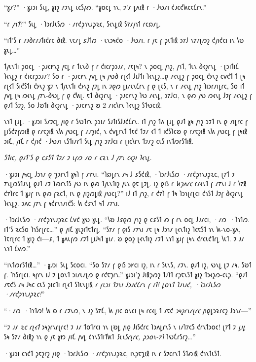 “𐑣𐑥?” ·𐑣𐑨𐑮𐑦 𐑕𐑧𐑛, 𐑣𐑦𐑟 𐑥𐑲𐑯𐑛 𐑧𐑤𐑕𐑢𐑺. “𐑣𐑴𐑤𐑛 𐑪𐑯, 𐑲'𐑥 𐑛𐑵𐑦𐑙 𐑩 ·𐑓𐑻𐑥𐑦 𐑒𐑨𐑤𐑒𐑿𐑤𐑱𐑖𐑩𐑯.”

“𐑩 \emph{𐑢𐑪𐑑}?” 𐑕𐑧𐑛 ·𐑐𐑮𐑩𐑓𐑧𐑕𐑼 ·𐑥𐑩𐑒𐑜𐑪𐑯𐑨𐑜𐑷𐑤, 𐑕𐑬𐑯𐑛𐑦𐑙 𐑕𐑳𐑥𐑢𐑪𐑑 𐑩𐑤𐑸𐑥𐑛.

“𐑦𐑑'𐑕 𐑩 𐑥𐑨𐑔𐑩𐑥𐑨𐑑𐑦𐑒𐑩𐑤 𐑔𐑦𐑙. 𐑯𐑱𐑥𐑛 𐑭𐑓𐑑𐑼 ·𐑧𐑯𐑮𐑰𐑒𐑴 ·𐑓𐑻𐑥𐑦. 𐑩 𐑢𐑱 𐑝 𐑜𐑧𐑑𐑦𐑙 𐑮𐑳𐑓 𐑯𐑳𐑥𐑚𐑼𐑟 𐑒𐑢𐑦𐑒𐑤𐑦 𐑦𐑯 𐑘𐑹 𐑣𐑧𐑛…”

𐑑𐑢𐑧𐑯𐑑𐑦 𐑜𐑴𐑤𐑛 ·𐑜𐑨𐑤𐑾𐑯𐑟 𐑢𐑱𐑛 𐑩 𐑑𐑧𐑯𐑔 𐑝 𐑩 𐑒𐑦𐑤𐑩𐑜𐑮𐑨𐑥, 𐑥𐑱𐑚𐑰? 𐑯 𐑜𐑴𐑤𐑛 𐑢𐑪𐑟, 𐑢𐑪𐑑, 𐑑𐑧𐑯 𐑔𐑬𐑟𐑩𐑯𐑛 ·𐑚𐑮𐑦𐑑𐑦𐑖 𐑐𐑬𐑯𐑛𐑟 𐑩 𐑒𐑦𐑤𐑩𐑜𐑮𐑨𐑥? 𐑕𐑴 𐑩 ·𐑜𐑨𐑤𐑾𐑯 𐑢𐑫𐑛 𐑚𐑰 𐑢𐑻𐑔 𐑩𐑚𐑬𐑑 𐑓𐑦𐑓𐑑𐑦 𐑐𐑬𐑯𐑛𐑟…𐑞 𐑥𐑬𐑯𐑛𐑟 𐑝 𐑜𐑴𐑤𐑛 𐑒𐑶𐑯𐑟 𐑤𐑫𐑒𐑑 𐑑 𐑚𐑰 𐑩𐑚𐑬𐑑 𐑕𐑦𐑒𐑕𐑑𐑦 𐑒𐑶𐑯𐑟 𐑣𐑲 𐑯 𐑑𐑢𐑧𐑯𐑑𐑦 𐑒𐑶𐑯𐑟 𐑢𐑲𐑛 𐑦𐑯 𐑲𐑞𐑼 𐑛𐑦𐑥𐑧𐑯𐑖𐑩𐑯 𐑝 𐑞 𐑚𐑱𐑕, 𐑯 𐑩 𐑥𐑬𐑯𐑛 𐑢𐑪𐑟 𐑐𐑦𐑮𐑩𐑥𐑦𐑛𐑩𐑤, 𐑕𐑴 𐑦𐑑 𐑢𐑫𐑛 𐑚𐑰 𐑼𐑬𐑯𐑛 𐑢𐑳𐑯-𐑔𐑻𐑛 𐑝 𐑞 𐑒𐑿𐑚. 𐑱𐑑 𐑔𐑬𐑟𐑩𐑯𐑛 ·𐑜𐑨𐑤𐑾𐑯𐑟 𐑐𐑻 𐑥𐑬𐑯𐑛, 𐑮𐑳𐑓𐑤𐑦, 𐑯 𐑞𐑺 𐑢𐑻 𐑼𐑬𐑯𐑛 𐑓𐑲𐑝 𐑥𐑬𐑯𐑛𐑟 𐑝 𐑞𐑨𐑑 𐑕𐑲𐑟, 𐑕𐑴 𐑓𐑹𐑑𐑦 𐑔𐑬𐑟𐑩𐑯𐑛 ·𐑜𐑨𐑤𐑾𐑯𐑟 𐑹 2 𐑥𐑦𐑤𐑘𐑩𐑯 𐑐𐑬𐑯𐑛𐑟 𐑕𐑑𐑻𐑤𐑦𐑙.

𐑯𐑪𐑑 𐑚𐑨𐑛. ·𐑣𐑨𐑮𐑦 𐑕𐑥𐑲𐑤𐑛 𐑢𐑦𐑞 𐑩 𐑕𐑻𐑑𐑩𐑯 𐑜𐑮𐑦𐑥 𐑕𐑨𐑑𐑦𐑕𐑓𐑨𐑒𐑖𐑩𐑯. 𐑦𐑑 𐑢𐑪𐑟 𐑑𐑵 𐑚𐑨𐑛 𐑞𐑨𐑑 𐑣𐑰 𐑢𐑪𐑟 𐑮𐑲𐑑 𐑦𐑯 𐑞 𐑥𐑦𐑛𐑩𐑤 𐑝 𐑛𐑦𐑕𐑒𐑳𐑝𐑼𐑦𐑙 𐑞 𐑩𐑥𐑱𐑟𐑦𐑙 𐑯𐑿 𐑢𐑻𐑤𐑛 𐑝 𐑥𐑨𐑡𐑦𐑒, 𐑯 𐑒𐑫𐑛𐑩𐑯𐑑 𐑑𐑱𐑒 𐑑𐑲𐑥 𐑬𐑑 𐑑 𐑦𐑒𐑕𐑐𐑤𐑹 𐑞 𐑩𐑥𐑱𐑟𐑦𐑙 𐑯𐑿 𐑢𐑻𐑤𐑛 𐑝 𐑚𐑰𐑦𐑙 𐑮𐑦𐑗, 𐑢𐑦𐑗 𐑩 𐑒𐑢𐑦𐑒 ·𐑓𐑻𐑥𐑦 𐑧𐑕𐑑𐑦𐑥𐑩𐑑 𐑕𐑧𐑛 𐑢𐑪𐑟 𐑮𐑳𐑓𐑤𐑦 𐑩 𐑚𐑦𐑤𐑘𐑩𐑯 𐑑𐑲𐑥𐑟 𐑤𐑧𐑕 𐑦𐑯𐑑𐑼𐑩𐑕𐑑𐑦𐑙.

\emph{𐑕𐑑𐑦𐑤, 𐑞𐑨𐑑'𐑕 𐑞 𐑤𐑭𐑕𐑑 𐑑𐑲𐑥 𐑲 𐑧𐑝𐑼 𐑥𐑴 𐑩 𐑤𐑷𐑯 𐑓 𐑢𐑳𐑯 𐑤𐑬𐑟𐑦 𐑐𐑬𐑯𐑛.}

·𐑣𐑨𐑮𐑦 𐑢𐑰𐑤𐑛 𐑓𐑮𐑪𐑥 𐑞 𐑡𐑲𐑩𐑯𐑑 𐑣𐑰𐑐 𐑝 𐑥𐑳𐑯𐑦. “𐑐𐑸𐑛𐑩𐑯 𐑥𐑰 𐑓 𐑭𐑕𐑒𐑦𐑙, ·𐑐𐑮𐑩𐑓𐑧𐑕𐑼 ·𐑥𐑩𐑒𐑜𐑪𐑯𐑨𐑜𐑷𐑤, 𐑚𐑳𐑑 𐑲 𐑳𐑯𐑛𐑼𐑕𐑑𐑨𐑯𐑛 𐑞𐑨𐑑 𐑥𐑲 𐑐𐑺𐑩𐑯𐑑𐑕 𐑢𐑻 𐑦𐑯 𐑞𐑺 𐑑𐑢𐑧𐑯𐑑𐑦𐑟 𐑢𐑧𐑯 𐑞𐑱 𐑛𐑲𐑛. 𐑦𐑟 𐑞𐑦𐑕 𐑩 \emph{𐑿𐑠𐑵𐑩𐑤} 𐑩𐑥𐑬𐑯𐑑 𐑝 𐑥𐑳𐑯𐑦 𐑓 𐑩 𐑘𐑳𐑙 𐑒𐑳𐑐𐑩𐑤 𐑑 𐑣𐑨𐑝 𐑦𐑯 𐑞𐑺 𐑝𐑷𐑤𐑑, 𐑦𐑯 𐑞 𐑢𐑦𐑟𐑼𐑛𐑦𐑙 𐑢𐑻𐑤𐑛?” 𐑦𐑓 𐑦𐑑 𐑢𐑪𐑟, 𐑩 𐑒𐑳𐑐 𐑝 𐑑𐑰 𐑐𐑮𐑪𐑚𐑩𐑚𐑤𐑦 𐑒𐑪𐑕𐑑 𐑓𐑲𐑝 𐑔𐑬𐑟𐑩𐑯𐑛 𐑐𐑬𐑯𐑛𐑟. 𐑮𐑵𐑤 𐑢𐑳𐑯 𐑝 𐑰𐑒𐑩𐑯𐑪𐑥𐑦𐑒𐑕: 𐑿 𐑒𐑭𐑯𐑑 𐑰𐑑 𐑥𐑳𐑯𐑦.

·𐑐𐑮𐑩𐑓𐑧𐑕𐑼 ·𐑥𐑩𐑒𐑜𐑪𐑯𐑨𐑜𐑷𐑤 𐑖𐑫𐑒 𐑣𐑻 𐑣𐑧𐑛. “𐑘𐑹 𐑓𐑭𐑞𐑼 𐑢𐑪𐑟 𐑞 𐑤𐑭𐑕𐑑 𐑺 𐑝 𐑩𐑯 𐑴𐑤𐑛 𐑓𐑨𐑥𐑤𐑦, ·𐑥𐑼~·𐑐𐑪𐑑𐑼. 𐑦𐑑'𐑕 𐑷𐑤𐑕𐑴 𐑐𐑪𐑕𐑩𐑚𐑩𐑤…” 𐑞 𐑢𐑦𐑗 𐑣𐑧𐑟𐑦𐑑𐑱𐑑𐑩𐑛. “𐑕𐑳𐑥 𐑝 𐑞𐑦𐑕 𐑥𐑳𐑯𐑦 𐑥𐑱 𐑚𐑰 𐑓𐑮𐑪𐑥 𐑚𐑬𐑯𐑑𐑦𐑟 𐑐𐑤𐑱𐑕𐑑 𐑪𐑯 𐑿-𐑯𐑴-𐑣𐑵, 𐑐𐑱𐑩𐑚𐑩𐑤 𐑑 𐑣𐑦𐑟 𐑒𐑦—𐑭, 𐑑 𐑣𐑵𐑧𐑝𐑼 𐑥𐑲𐑑 𐑛𐑦𐑓𐑰𐑑 𐑣𐑦𐑥. 𐑹 𐑞𐑴𐑟 𐑚𐑬𐑯𐑑𐑦𐑟 𐑥𐑲𐑑 𐑯𐑪𐑑 𐑣𐑨𐑝 𐑚𐑰𐑯 𐑒𐑩𐑤𐑧𐑒𐑑𐑩𐑛 𐑘𐑧𐑑. 𐑲 𐑨𐑥 𐑯𐑪𐑑 𐑖𐑫𐑼.”

“𐑦𐑯𐑑𐑼𐑩𐑕𐑑𐑦𐑙…” ·𐑣𐑨𐑮𐑦 𐑕𐑧𐑛 𐑕𐑤𐑴𐑤𐑦. “𐑕𐑴 𐑕𐑳𐑥 𐑝 𐑞𐑦𐑕 𐑮𐑾𐑤𐑦 𐑦𐑟, 𐑦𐑯 𐑩 𐑕𐑧𐑯𐑕, 𐑥𐑲𐑯. 𐑞𐑨𐑑 𐑦𐑟, 𐑻𐑯𐑛 𐑚𐑲 𐑥𐑰. 𐑕𐑹𐑑 𐑝. 𐑐𐑪𐑕𐑩𐑚𐑤𐑦. 𐑰𐑝𐑩𐑯 𐑦𐑓 𐑲 𐑛𐑴𐑯𐑑 𐑮𐑦𐑥𐑧𐑥𐑚𐑼 𐑞 𐑩𐑒𐑱𐑠𐑩𐑯.” 𐑣𐑨𐑮𐑦'𐑟 𐑓𐑦𐑙𐑜𐑼𐑟 𐑑𐑨𐑐𐑑 𐑩𐑜𐑱𐑯𐑕𐑑 𐑣𐑦𐑟 𐑑𐑮𐑬𐑟𐑼-𐑤𐑧𐑜. “𐑞𐑨𐑑 𐑥𐑱𐑒𐑕 𐑥𐑰 𐑓𐑰𐑤 𐑤𐑧𐑕 𐑜𐑦𐑤𐑑𐑦 𐑩𐑚𐑬𐑑 𐑕𐑐𐑧𐑯𐑛𐑦𐑙 \emph{𐑩 𐑝𐑧𐑮𐑦 𐑑𐑲𐑯𐑦 𐑓𐑮𐑨𐑒𐑖𐑩𐑯 𐑝 𐑦𐑑! 𐑛𐑴𐑯𐑑 𐑐𐑨𐑯𐑦𐑒, ·𐑐𐑮𐑩𐑓𐑧𐑕𐑼 ·𐑥𐑩𐑒𐑜𐑪𐑯𐑨𐑜𐑷𐑤!}”

“·𐑥𐑼~·𐑐𐑪𐑑𐑼! 𐑿 𐑸 𐑩 𐑥𐑲𐑯𐑼, 𐑯 𐑨𐑟 𐑕𐑳𐑗, 𐑿 𐑢𐑦𐑤 𐑴𐑯𐑤𐑦 𐑚𐑰 𐑩𐑤𐑬𐑛 𐑑 𐑥𐑱𐑒 \emph{𐑮𐑰𐑟𐑩𐑯𐑩𐑚𐑩𐑤} 𐑢𐑦𐑞𐑛𐑮𐑷𐑩𐑤𐑟 𐑓𐑮𐑪𐑥—”

“𐑲 𐑨𐑥 \emph{𐑷𐑤 𐑩𐑚𐑬𐑑} 𐑮𐑰𐑟𐑩𐑯𐑩𐑚𐑩𐑤! 𐑲 𐑨𐑥 𐑑𐑴𐑑𐑩𐑤𐑦 𐑪𐑯 𐑚𐑹𐑛 𐑢𐑦𐑞 𐑓𐑦𐑕𐑒𐑩𐑤 𐑐𐑮𐑵𐑛𐑩𐑯𐑕 𐑯 𐑦𐑥𐑐𐑳𐑤𐑕 𐑒𐑩𐑯𐑑𐑮𐑴𐑤! 𐑚𐑳𐑑 𐑲 \emph{𐑛𐑦𐑛} 𐑕𐑰 𐑕𐑳𐑥 𐑔𐑦𐑙𐑟 𐑪𐑯 𐑞 𐑢𐑱 𐑣𐑽 𐑢𐑦𐑗 𐑢𐑫𐑛 𐑒𐑪𐑯𐑕𐑑𐑦𐑑𐑿𐑑 \emph{𐑕𐑧𐑯𐑕𐑩𐑚𐑩𐑤, 𐑜𐑮𐑴𐑯-𐑳𐑐} 𐑐𐑻𐑗𐑩𐑕𐑩𐑟…”

·𐑣𐑨𐑮𐑦 𐑤𐑪𐑒𐑑 𐑜𐑱𐑟𐑩𐑟 𐑢𐑦𐑞 ·𐑐𐑮𐑩𐑓𐑧𐑕𐑼 ·𐑥𐑩𐑒𐑜𐑪𐑯𐑨𐑜𐑷𐑤, 𐑦𐑯𐑜𐑱𐑡𐑦𐑙 𐑦𐑯 𐑩 𐑕𐑲𐑤𐑩𐑯𐑑 𐑕𐑑𐑺𐑦𐑙 𐑒𐑪𐑯𐑑𐑧𐑕𐑑.

